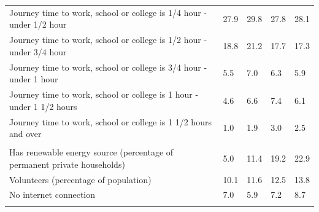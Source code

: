 \documentclass{article}
\begin{document}
\begin{table}[h]
\begin{tabular}{KTTTT}
Journey time to work, school or college is 1/4 hour - under 1/2 hour & 27.9& 29.8& 27.8& 28.1\\
Journey time to work, school or college is 1/2 hour - under 3/4 hour & 18.8& 21.2& 17.7& 17.3\\
Journey time to work, school or college is 3/4 hour - under 1 hour & 5.5& 7.0& 6.3& 5.9\\
Journey time to work, school or college is 1 hour - under 1 1/2 hours & 4.6& 6.6& 7.4& 6.1\\
Journey time to work, school or college is 1 1/2 hours and over & 1.0& 1.9& 3.0& 2.5\\
\hline
    \\ 
    \hline
Has renewable energy source (percentage of permanent private households) &  5.0& 11.4& 19.2& 22.9\\
    \hline
Volunteers (percentage of population) & 10.1& 11.6& 12.5& 13.8\\
    \hline
No internet connection& 7.0& 5.9& 7.2& 8.7\\
\hline
\end{tabular}
\end{table}
\end{document}
